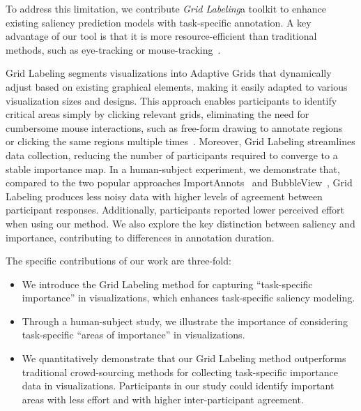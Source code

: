 To address this limitation, we contribute \textit{Grid Labeling}a toolkit to enhance existing saliency prediction models with task-specific annotation. 
A key advantage of our tool is that it is more resource-efficient than traditional methods, such as eye-tracking or mouse-tracking~\cite{graphicDesignImportance, importAnnot, bubbleView, turkeyes, salchartQA}.

Grid Labeling segments visualizations into Adaptive Grids that dynamically adjust based on existing graphical elements, making it easily adapted to various visualization sizes and designs. 
This approach enables participants to identify critical areas simply by clicking relevant grids, eliminating the need for cumbersome mouse interactions, such as free-form drawing to annotate regions~\cite{importAnnot} or clicking the same regions multiple times~\cite{bubbleView}.
Moreover, Grid Labeling streamlines data collection, reducing the number of participants required to converge to a stable importance map.
In a human-subject experiment, we demonstrate that, compared to the two popular approaches ImportAnnots~\cite{importAnnot} and BubbleView~\cite{bubbleView}, Grid Labeling produces less noisy data with higher levels of agreement between participant responses.
Additionally, participants reported lower perceived effort when using our method. We also explore the key distinction between saliency and importance, contributing to differences in annotation duration.

The specific contributions of our work are three-fold:
\begin{itemize}
    \item We introduce the Grid Labeling method for capturing ``task-specific importance'' in visualizations, which enhances task-specific saliency modeling.

    \item Through a human-subject study, we illustrate the importance of considering task-specific ``areas of importance'' in visualizations.

    \item We quantitatively demonstrate that our Grid Labeling method outperforms traditional crowd-sourcing methods for collecting task-specific importance data in visualizations. Participants in our study could identify important areas with less effort and with higher inter-participant agreement.
\end{itemize}


